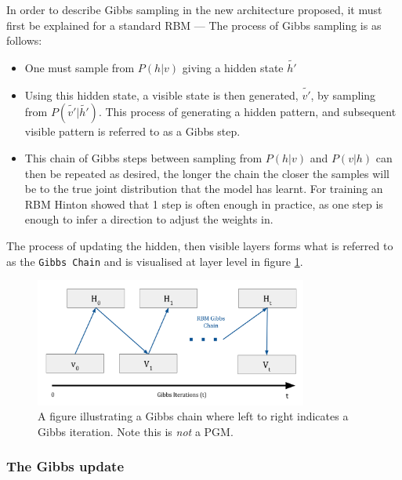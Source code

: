 In order to describe Gibbs sampling in the new architecture proposed, it must first be explained for a standard RBM --- The process of Gibbs sampling is as follows:
  \begin{itemize}
    \item One must sample from $P(h|v)$ giving a hidden state $\tilde{h'}$
    \item Using this hidden state, a visible state is then generated, $\tilde{v'}$, by sampling from $P(\tilde{v'}|\tilde{h'})$. This process of generating a hidden pattern, and subsequent visible pattern is referred to as a Gibbs step.
    \item This chain of Gibbs steps between sampling from $P(h|v)$ and $P(v|h)$ can then be repeated as desired, the longer the chain the closer the samples will be to the true joint distribution that the model has learnt. For training an RBM Hinton showed that 1 step is often enough in practice, as one step is enough to infer a direction to adjust the weights in.
  \end{itemize}
  The process of updating the hidden, then visible layers forms what is referred to as the \texttt{Gibbs Chain} and is visualised at layer level in figure \ref{F:Gibbs_Chain}.
  \begin{figure}[h]
    \begin{center}
      \includegraphics[width=0.8\textwidth]{Assets/RBM-Gibbs-Chain.png}
    \end{center}
    \caption{A figure illustrating a Gibbs chain where left to right indicates a Gibbs iteration. Note this is \emph{not} a PGM.}
    \label{F:Gibbs_Chain}
  \end{figure}

  \subsubsection{The Gibbs update}\label{S:Gibbs-Update}

